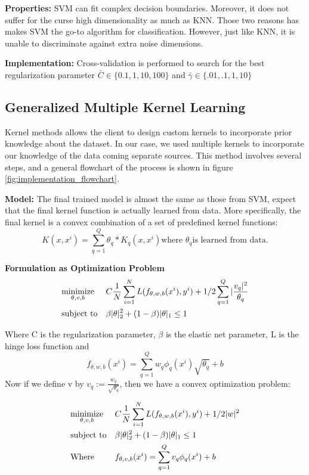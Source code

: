 \documentclass{article}
\begin{document}
\textbf{Properties:}
SVM can fit complex decision boundaries. Moreover, it does not suffer for the curse high dimensionality as much as KNN. Those two reasons has makes SVM the go-to algorithm for classification. However, just like KNN, it is unable to discriminate against extra noise dimensions.

\textbf{Implementation:}
Cross-validation is performed to search for the best regularization parameter $\bar{C} \in \{0.1, 1, 10, 100\}$ and $\bar{\gamma} \in \{.01, .1, 1, 10\}$




\subsection*{Generalized Multiple Kernel Learning}
Kernel methods allows the client to design custom kernels to incorporate prior knowledge about the dataset. In our case, we used multiple kernels to incorporate our knowledge of the data coming separate sources. This method involves several steps, and a general flowchart of the process is shown in figure \ref{fig:implementation_flowchart}.

\textbf{Model:}
The final trained model is almost the same as those from SVM, expect that the final kernel function is actually learned from data. More specifically, the final kernel is a convex combination of a set of predefined kernel functions: $$K(x, x^i) = \sum_{q=1}^{Q} \theta_q * K_q(x, x^i) \text{where }\theta_q \text{is learned from data}.$$

\textbf{Formulation as Optimization Problem}
\begin{align*}
&\text{$\underset{\theta, v, b}{\text{minimize}}$} & &C  \frac{1}{N} \sum_{i=1}^{N} L(f_{\theta, w, b}(x^i), y^i) + 1/2 \sum_{q=1}^{Q}|\frac{v_q|^2}{\theta_q} \\
&\text{subject to} & &\beta|\theta|_2^2 + (1-\beta){|\theta|_1} \leq 1
\end{align*}


Where C is the regularization parameter, $\beta$ is the elastic net parameter, L is the hinge loss function and $$f_{\theta, w, b}(x^i) = \sum_{q=1}^{Q} w_q \phi_q(x^i) \sqrt{\theta_q} + b $$
Now if we define v by $v_q := \frac{w_q}{\sqrt{\theta_q}}$, then we have a convex optimization problem:

\begin{align*}
&\text{$\underset{\theta, v, b}{\text{minimize}}$} & &C  \frac{1}{N} \sum_{i=1}^{N} L(f_{\theta, w, b}(x^i), y^i) + 1/2 |w|^2 \\
&\text{subject to} & &\beta|\theta|_2^2 + (1-\beta){|\theta|_1} \leq 1 \\
&\text{Where}  & &f_{\theta, v, b}(x^i) = \sum_{q=1}^{Q} v_q \phi_q(x^i)  + b
\end{align*}
\end{document}
